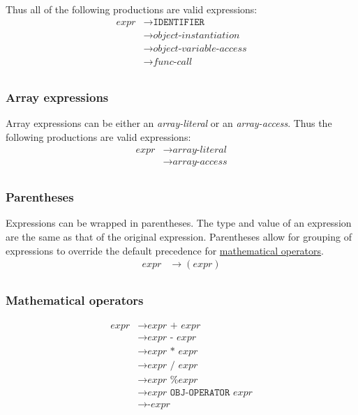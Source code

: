 \documentclass{article}
\begin{document}
Thus all of the following productions are valid expressions:
\begin{align*}
    \textit{expr} &\to \texttt{IDENTIFIER} \\
    &\to \hyperref[sec:object-instantiation]{\textit{object-instantiation}} \\
    &\to \hyperref[sec:object-variable-access]{\textit{object-variable-access}} \\
    &\to \hyperref[sec:func-call]{\textit{func-call}} \\
\end{align*}

\subsubsection{Array expressions}
Array expressions can be either an \textit{array-literal} or an \textit{array-access}. Thus the following productions are valid expressions:
\begin{align*}
    \textit{expr} &\to \hyperref[sec:array-literal]{\textit{array-literal}} \\
    &\to \hyperref[sec:array-access]{\textit{array-access}} \\
\end{align*}

\subsubsection{Parentheses}
Expressions can be wrapped in parentheses. The type and value of an expression are the same as that of the original expression. Parentheses allow for grouping of expressions to override the default precedence for \hyperref[sec:expr-mathematical-operators]{mathematical operators}.
\begin{align*}
    \textit{expr} &\to (\hyperref[sec:expr]{\textit{expr}}) \\
\end{align*}

\subsubsection{Mathematical operators}
\label{sec:expr-mathematical-operators}
\begin{align*}
    \textit{expr} &\to \hyperref[sec:expr]{\textit{expr}} \texttt{ + } \hyperref[sec:expr]{\textit{expr}} \\
    &\to \hyperref[sec:expr]{\textit{expr}} \texttt{ - } \hyperref[sec:expr]{\textit{expr}} \\
    &\to \hyperref[sec:expr]{\textit{expr}} \texttt{ * } \hyperref[sec:expr]{\textit{expr}} \\
    &\to \hyperref[sec:expr]{\textit{expr}} \texttt{ / } \hyperref[sec:expr]{\textit{expr}} \\
    &\to \hyperref[sec:expr]{\textit{expr}} \texttt{ \% } \hyperref[sec:expr]{\textit{expr}} \\
    &\to \hyperref[sec:expr]{\textit{expr}} \texttt{ OBJ-OPERATOR } \hyperref[sec:expr]{\textit{expr}} \\
    &\to \texttt{-}\hyperref[sec:expr]{\textit{expr}} \\
\end{align*}
\end{document}
